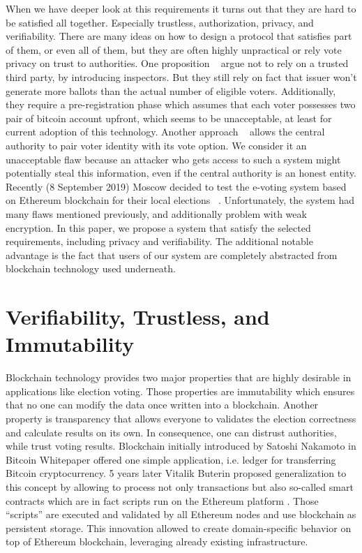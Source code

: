 \documentclass[runningheads]{llncs}
\begin{document}
When we have deeper look at this requirements 
it turns out that they are hard to be satisfied all together. Especially trustless, authorization, privacy, and verifiability. 
% 
There are many ideas on how to design a protocol that satisfies part of them, or even all of them, but they are often highly unpractical or rely vote privacy on trust to authorities. One proposition ~\cite{liu2017voting} argue not to rely on a trusted third party, by introducing inspectors. But they still rely on fact that issuer won't generate more ballots than the actual number of eligible voters. Additionally, they require a pre-registration phase which assumes that each voter possesses two pair of bitcoin account upfront, which seems to be unacceptable, at least for current adoption of this technology. Another approach ~\cite{hardwick2018voting} allows the central authority to pair voter identity with its vote option. We consider it an unacceptable flaw because an attacker who gets access to such a system might potentially steal this information, even if the central authority is an honest entity. Recently (8 September 2019) Moscow decided to test the e-voting system based on Ethereum blockchain for their local elections ~\cite{gaudry2019breaking}. Unfortunately, the system had many flaws mentioned previously, and additionally problem with weak encryption.  
In this paper, we propose a system that satisfy  the selected requirements, including privacy and verifiability. 
The additional notable advantage is the fact that users of our system are completely abstracted from blockchain technology used underneath.



\section{Verifiability, Trustless, and Immutability}
Blockchain technology provides two major properties that are highly desirable in applications like election voting. Those properties are immutability which ensures that no one can modify the data once written into a blockchain. 
Another property is transparency that allows everyone to validates the election correctness and calculate results on its own. In consequence, one can distrust authorities, while trust voting results. 
Blockchain initially introduced by Satoshi Nakamoto in Bitcoin Whitepaper \cite{nakamoto2008bitcoin} 
offered one simple application, i.e. ledger for transferring Bitcoin cryptocurrency. 5 years later Vitalik Buterin proposed generalization to this concept by allowing to process not only transactions but also so-called smart contracts which are in fact scripts run on the Ethereum platform \cite{buterin2013ethereum}. Those “scripts” are executed and validated by all Ethereum nodes and use blockchain as persistent storage. This innovation allowed to create domain-specific behavior on top of Ethereum blockchain, leveraging already existing infrastructure.
\end{document}
